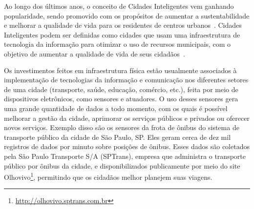 

Ao longo dos últimos anos, o conceito de Cidades Inteligentes vem ganhando popularidade, sendo promovido com os propósitos de aumentar a sustentabilidade e melhorar a qualidade de vida para os residentes de centros urbanos~\citep{kon2016cidades}. Cidades Inteligentes podem ser definidas como cidades que usam uma infraestrutura de tecnologia da informação para otimizar o uso de recursos municipais, com o objetivo de aumentar a qualidade de vida de seus cidadãos~\citep{doi:10.1080/10630732.2011.601117}. 

Os investimentos feitos em infraestrutura física estão usualmente associados à implementação de tecnologias da informação e comunicação nos diferentes setores de uma cidade (transporte, saúde, educação, comércio, etc.), feita por meio de dispositivos eletrônicos, como sensores e atuadores. 
O uso desses sensores gera uma grande quantidade de dados a todo momento, com os quais é possível melhorar a gestão da cidade, aprimorar os serviços públicos e privados ou oferecer novos serviços.
Exemplo disso são os sensores da frota de ônibus do sistema de transporte público da cidade de São Paulo, SP.  Eles geram cerca de dez mil registros de dados por minuto sobre posições de ônibus.  Esses dados são coletados pela São Paulo Transporte S/A (SPTrans), empresa que administra o transporte público por ônibus da cidade, e disponibilizados publicamente por meio do site Olhovivo\footnote{\url{http://olhovivo.sptrans.com.br}}, permitindo que os cidadãos melhor planejem suas viagens.






